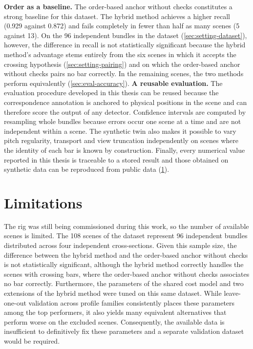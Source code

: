 \documentclass[a4paper, 12pt, twoside]{book}
\begin{document}
\textbf{Order as a baseline.} The order-based anchor without checks constitutes a strong baseline for this dataset. The hybrid method achieves a higher recall (0.929 against 0.872) and fails completely in fewer than half as many scenes (5 against 13). On the 96 independent bundles in the dataset (\cref{sec:setting-dataset}), however, the difference in recall is not statistically significant because the hybrid method's advantage stems entirely from the six scenes in which it accepts the crossing hypothesis (\cref{sec:setting-pairing}) and on which the order-based anchor without checks pairs no bar correctly. In the remaining scenes, the two methods perform equivalently (\cref{sec:eval-accuracy}).
\newpage
\textbf{A reusable evaluation.} The evaluation procedure developed in this thesis can be reused because the correspondence annotation is anchored to physical positions in the scene and can therefore score the output of any detector. Confidence intervals are computed by resampling whole bundles because errors occur one scene at a time and are not independent within a scene. The synthetic twin also makes it possible to vary pitch regularity, transport and view truncation independently on scenes where the identity of each bar is known by construction. Finally, every numerical value reported in this thesis is traceable to a stored result and those obtained on synthetic data can be reproduced from public data (\cref{sec:concl-limitations}).

\section{Limitations}
\label{sec:concl-limitations}

The rig was still being commissioned during this work, so the number of available scenes is limited. The 108 scenes of the dataset represent 96 independent bundles distributed across four independent cross-sections. Given this sample size, the difference between the hybrid method and the order-based anchor without checks is not statistically significant, although the hybrid method correctly handles the scenes with crossing bars, where the order-based anchor without checks associates no bar correctly. Furthermore, the parameters of the shared cost model and two extensions of the hybrid method were tuned on this same dataset. While leave-one-out validation across profile families consistently places these parameters among the top performers, it also yields many equivalent alternatives that perform worse on the excluded scenes. Consequently, the available data is insufficient to definitively fix these parameters and a separate validation dataset would be required.
\end{document}
